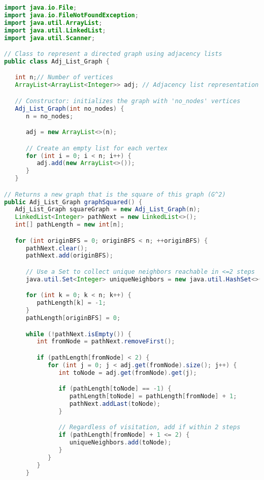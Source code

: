 \documentclass[11pt]{article}
\begin{document}
\lstset{
    basicstyle=\ttfamily\footnotesize,
    breaklines=true,
    frame=single,
    numbers=left,
    tabsize=4,
    showstringspaces=false
}
\begin{lstlisting}[language=Java]
import java.io.File;
import java.io.FileNotFoundException;
import java.util.ArrayList;
import java.util.LinkedList;
import java.util.Scanner;

// Class to represent a directed graph using adjacency lists
public class Adj_List_Graph {

   int n;// Number of vertices
   ArrayList<ArrayList<Integer>> adj; // Adjacency list representation

   // Constructor: initializes the graph with 'no_nodes' vertices
   Adj_List_Graph(int no_nodes) {
      n = no_nodes;

      adj = new ArrayList<>(n);

      // Create an empty list for each vertex
      for (int i = 0; i < n; i++) {
         adj.add(new ArrayList<>());
      }
   }

// Returns a new graph that is the square of this graph (G^2)
public Adj_List_Graph graphSquared() {
   Adj_List_Graph squareGraph = new Adj_List_Graph(n);
   LinkedList<Integer> pathNext = new LinkedList<>();
   int[] pathLength = new int[n];

   for (int originBFS = 0; originBFS < n; ++originBFS) {
      pathNext.clear();
      pathNext.add(originBFS);

      // Use a Set to collect unique neighbors reachable in <=2 steps
      java.util.Set<Integer> uniqueNeighbors = new java.util.HashSet<>();

      for (int k = 0; k < n; k++) {
         pathLength[k] = -1;
      }
      pathLength[originBFS] = 0;

      while (!pathNext.isEmpty()) {
         int fromNode = pathNext.removeFirst();

         if (pathLength[fromNode] < 2) {
            for (int j = 0; j < adj.get(fromNode).size(); j++) {
               int toNode = adj.get(fromNode).get(j);

               if (pathLength[toNode] == -1) {
                  pathLength[toNode] = pathLength[fromNode] + 1;
                  pathNext.addLast(toNode);
               }

               // Regardless of visitation, add if within 2 steps
               if (pathLength[fromNode] + 1 <= 2) {
                  uniqueNeighbors.add(toNode);
               }
            }
         }
      }


\end{lstlisting}
\end{document}
